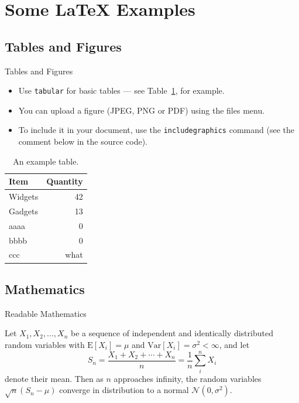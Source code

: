 \documentclass{beamer}
\begin{document}
\section{Some \LaTeX{} Examples}

\subsection{Tables and Figures}

\begin{frame}{Tables and Figures}

\begin{itemize}
\item Use \texttt{tabular} for basic tables --- see Table~\ref{tab:widgets}, for example.
\item You can upload a figure (JPEG, PNG or PDF) using the files menu. 
\item To include it in your document, use the \texttt{includegraphics} command (see the comment below in the source  code).
\end{itemize}



\begin{table}  
\centering
\begin{tabular}{l|r}
Item & Quantity \\\hline
Widgets & 42 \\
Gadgets & 13 \\
aaaa    &  0  \\
bbbb    &  0   \\
ccc     &  what
\end{tabular}
\caption{\label{tab:widgets}An example table.}
\end{table}

\end{frame}

\subsection{Mathematics}

\begin{frame}{Readable Mathematics}

Let $X_1, X_2, \ldots, X_n$ be a sequence of independent and identically distributed random variables with $\text{E}[X_i] = \mu$ and $\text{Var}[X_i] = \sigma^2 < \infty$, and let
$$S_n = \frac{X_1  + X_2 + \cdots + X_n}{n}
      = \frac{1}{n}\sum_{i}^{n} X_i$$
denote their mean. Then as $n$ approaches infinity, the random variables $\sqrt{n}(S_n - \mu)$ converge in distribution to a normal $\mathcal{N}(0, \sigma^2)$.

\end{frame}
\end{document}
